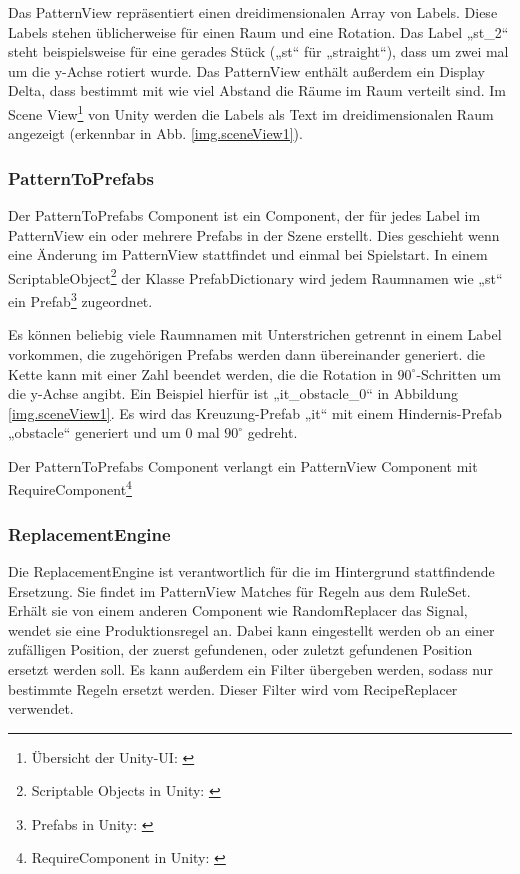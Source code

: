 Das PatternView repräsentiert einen dreidimensionalen Array von Labels. Diese Labels stehen üblicherweise für einen Raum und eine Rotation. Das Label „st\_2“ steht beispielsweise für eine gerades Stück („st“ für „straight“), dass um zwei mal um die y-Achse rotiert wurde. Das PatternView enthält außerdem ein Display Delta, dass bestimmt mit wie viel Abstand die Räume im Raum verteilt sind. Im Scene View\footnote{Übersicht der Unity-UI: \cite[Seite: LearningtheInterface]{unityManual}} von Unity werden die Labels als Text im dreidimensionalen Raum angezeigt (erkennbar in Abb. \ref{img.sceneView1}).


\subsubsection{PatternToPrefabs}

Der PatternToPrefabs Component ist ein Component, der für jedes Label im PatternView ein oder mehrere Prefabs in der Szene erstellt. Dies geschieht wenn eine Änderung im PatternView stattfindet und einmal bei Spielstart. In einem ScriptableObject\footnote{Scriptable Objects in Unity: \cite[Seite: class-ScriptableObject]{unityManual}} der Klasse PrefabDictionary wird jedem Raumnamen wie „st“ ein Prefab\footnote{Prefabs in Unity: \cite[Seite: LearningtheInterface]{unityManual}} zugeordnet. 

Es können beliebig viele Raumnamen mit Unterstrichen getrennt in einem Label vorkommen, die zugehörigen Prefabs werden dann übereinander generiert. die Kette kann mit einer Zahl beendet werden, die die Rotation in $90^\circ$-Schritten um die y-Achse angibt. Ein Beispiel hierfür ist „it\_obstacle\_0“ in Abbildung \ref{img.sceneView1}. Es wird das Kreuzung-Prefab „it“ mit einem Hindernis-Prefab „obstacle“ generiert und um 0 mal $90^\circ$ gedreht.

Der PatternToPrefabs Component verlangt ein PatternView Component mit RequireComponent\footnote{RequireComponent in Unity: \cite[Seite: RequireComponent]{unitySciptingReference}}

\subsubsection{ReplacementEngine}

Die ReplacementEngine ist verantwortlich für die im Hintergrund stattfindende Ersetzung. Sie findet im PatternView Matches für Regeln aus dem RuleSet. Erhält sie von einem anderen Component wie RandomReplacer das Signal, wendet sie eine Produktionsregel an. Dabei kann eingestellt werden ob an einer zufälligen Position, der zuerst gefundenen, oder zuletzt gefundenen Position ersetzt werden soll. Es kann außerdem ein Filter übergeben werden, sodass nur bestimmte Regeln ersetzt werden. Dieser Filter wird vom RecipeReplacer verwendet.

